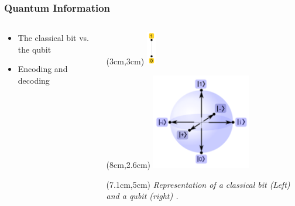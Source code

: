 \documentclass[]{beamer}
\begin{document}
\begin{frame}
	\frametitle{Quantum Information}
	\begin{columns}
		\begin{column}{0.5\textwidth}
		\begin{itemize}
			\item The classical bit vs. the qubit
			\vspace{2cm}
			\item Encoding and decoding
		\end{itemize}
		\end{column}
		\begin{column}{0.5\textwidth}  %
			\begin{center}
				\begin{textblock*}{10cm}(3cm,3cm)
				\includegraphics[width=0.05\textwidth]{ClassicalBit.png}
				\end{textblock*}
				\begin{textblock*}{5cm}(8cm,2.6cm)
				\includegraphics[width=0.5\textwidth]{QuantumBit.png}
				\end{textblock*}
				\begin{textblock*}{5cm}(7.1cm,5cm)
				\tiny	\textit{Representation of a classical bit (Left) and a qubit (right) \cite{Pomorski2018}.}
				\end{textblock*}
			\end{center}
		\end{column}
	\end{columns}
\end{frame}
\end{document}
